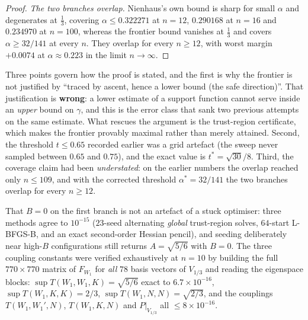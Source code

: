 \begin{proof}
\emph{The two branches overlap.} Nienhaus's own bound is sharp for small $\alpha$ and degenerates at $\tfrac13$, covering $\alpha\le0.322271$ at $n=12$, $0.290168$ at $n=16$ and $0.234970$ at $n=100$, whereas the frontier bound vanishes at $\tfrac13$ and covers $\alpha\ge32/141$ at every $n$. They overlap for every $n\ge12$, with worst margin $+0.0074$ at $\alpha\approx0.223$ in the limit $n\to\infty$.
\end{proof}

\begin{remarkstar}
Three points govern how the proof is stated, and the first is why the frontier is not justified by ``traced by ascent, hence a lower bound (the safe direction)''. That justification is \textbf{wrong}: a lower estimate of a support function cannot serve inside an \emph{upper} bound on $\gamma$, and this is the error class that sank two previous attempts on the same estimate. What rescues the argument is the trust-region certificate, which makes the frontier provably maximal rather than merely attained. Second, the threshold $t\le0.65$ recorded earlier was a grid artefact (the sweep never sampled between $0.65$ and $0.75$), and the exact value is $t^{*}=\sqrt{30}/8$. Third, the coverage claim had been \emph{understated}: on the earlier numbers the overlap reached only $n\le109$, and with the corrected threshold $\alpha^{*}=32/141$ the two branches overlap for every $n\ge12$.
\end{remarkstar}

\begin{certificate}
That $B=0$ on the first branch is not an artefact of a stuck optimiser: three methods agree to $10^{-15}$ ($23$-seed alternating \emph{global} trust-region solves, $64$-start L-BFGS-B, and an exact second-order Hessian pencil), and seeding deliberately near high-$B$ configurations still returns $A=\sqrt{5/6}$ with $B=0$. The three coupling constants were verified exhaustively at $n=10$ by building the full $770\times770$ matrix of $F_{W_1}$ for \emph{all} $78$ basis vectors of $V_{1/3}$ and reading the eigenspace blocks: $\sup T(W_1,W_1,K)=\sqrt{5/6}$ exact to $6.7\times10^{-16}$, $\sup T(W_1,K,K)=2/3$, $\sup T(W_1,N,N)=\sqrt{2/3}$, and the couplings $T(W_1,W_1',N)$, $T(W_1,K,N)$ and $P|_{V_{1/3}}$ all $\le8\times10^{-16}$.
\end{certificate}

